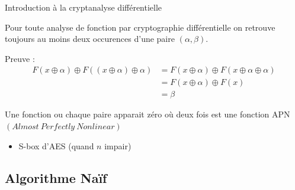\documentclass[10pt]{beamer}
\begin{document}
\begin{frame}{Introduction à la cryptanalyse différentielle} %
    
    Pour toute analyse de fonction par cryptographie différentielle on retrouve toujours au moins deux occurences d'une paire $(\alpha,\beta)$.
    
    \begin{block}{Preuve : \\ }
        \begin{align*}
            F(x \oplus \alpha) \oplus F((x \oplus \alpha) \oplus \alpha) &= F(x \oplus \alpha) \oplus F(x \oplus \alpha \oplus \alpha)\\ &= F(x \oplus \alpha) \oplus F(x)\\ &= \beta
        \end{align*}    
    \end{block}

    Une fonction ou chaque paire apparait zéro où deux fois est une fonction APN $(Almost \ Perfectly \ Nonlinear)$
    \begin{itemize}
        \item S-box d'AES (quand $n$ impair)
    \end{itemize}

\end{frame}

\subsection{Algorithme Naïf}
\end{document}
